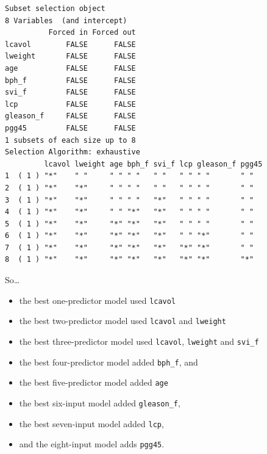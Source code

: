 \documentclass[]{book}
\newenvironment{Shaded}{\begin{snugshade}}{\end{snugshade}}
\newcommand{\KeywordTok}[1]{\textcolor[rgb]{0.13,0.29,0.53}{\textbf{#1}}}
\newcommand{\DataTypeTok}[1]{\textcolor[rgb]{0.13,0.29,0.53}{#1}}
\newcommand{\DecValTok}[1]{\textcolor[rgb]{0.00,0.00,0.81}{#1}}
\newcommand{\StringTok}[1]{\textcolor[rgb]{0.31,0.60,0.02}{#1}}
\newcommand{\OperatorTok}[1]{\textcolor[rgb]{0.81,0.36,0.00}{\textbf{#1}}}
\newcommand{\NormalTok}[1]{#1}
\providecommand{\tightlist}{%
  \setlength{\itemsep}{0pt}\setlength{\parskip}{0pt}}
\theoremstyle{definition}
\theoremstyle{definition}
\theoremstyle{definition}
\theoremstyle{remark}
\begin{document}
\begin{Shaded}
\end{Shaded}

\begin{verbatim}
Subset selection object
8 Variables  (and intercept)
          Forced in Forced out
lcavol        FALSE      FALSE
lweight       FALSE      FALSE
age           FALSE      FALSE
bph_f         FALSE      FALSE
svi_f         FALSE      FALSE
lcp           FALSE      FALSE
gleason_f     FALSE      FALSE
pgg45         FALSE      FALSE
1 subsets of each size up to 8
Selection Algorithm: exhaustive
         lcavol lweight age bph_f svi_f lcp gleason_f pgg45
1  ( 1 ) "*"    " "     " " " "   " "   " " " "       " "  
2  ( 1 ) "*"    "*"     " " " "   " "   " " " "       " "  
3  ( 1 ) "*"    "*"     " " " "   "*"   " " " "       " "  
4  ( 1 ) "*"    "*"     " " "*"   "*"   " " " "       " "  
5  ( 1 ) "*"    "*"     "*" "*"   "*"   " " " "       " "  
6  ( 1 ) "*"    "*"     "*" "*"   "*"   " " "*"       " "  
7  ( 1 ) "*"    "*"     "*" "*"   "*"   "*" "*"       " "  
8  ( 1 ) "*"    "*"     "*" "*"   "*"   "*" "*"       "*"  
\end{verbatim}

So\ldots{}

\begin{itemize}
\tightlist
\item
  the best one-predictor model used \texttt{lcavol}
\item
  the best two-predictor model used \texttt{lcavol} and \texttt{lweight}
\item
  the best three-predictor model used \texttt{lcavol}, \texttt{lweight}
  and \texttt{svi\_f}
\item
  the best four-predictor model added \texttt{bph\_f}, and
\item
  the best five-predictor model added \texttt{age}
\item
  the best six-input model added \texttt{gleason\_f},
\item
  the best seven-input model added \texttt{lcp},
\item
  and the eight-input model adds \texttt{pgg45}.
\end{itemize}
\end{document}
